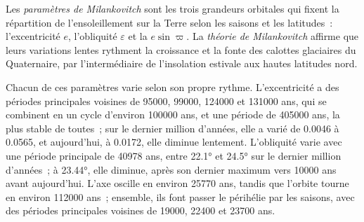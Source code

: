 \begin{definition}\label{def:b2:orbital-forcing:milankovitch}
Les \emph{paramètres de Milankovitch} sont les trois grandeurs orbitales
qui fixent la répartition de l'ensoleillement sur la Terre selon les saisons et les latitudes~: l'excentricité $e$,
l'obliquité $\varepsilon$ et la  $e\sin\varpi$. La \emph{théorie de
Milankovitch} affirme que leurs variations lentes rythment la croissance
et la fonte des calottes glaciaires du Quaternaire, par l'intermédiaire de l'insolation estivale aux
hautes latitudes nord.
\end{definition}

Chacun de ces paramètres varie selon son propre rythme. L'excentricité a des périodes principales voisines de \num{95000},
\num{99000}, \num{124000} et \num{131000} ans, qui se combinent en un cycle d'environ
\num{100000} ans, et une période de \num{405000} ans, la plus stable de toutes~; sur le dernier
million d'années, elle a varié de \num{0.0046} à \num{0.0565}, et aujourd'hui, à \num{0.0172}, elle diminue lentement.
L'obliquité varie avec une période principale de \num{40978} ans, entre \ang{22.1} et
\ang{24.5} sur le dernier million d'années~; à \ang{23.44}, elle diminue, après son dernier maximum
vers \num{10000} ans avant aujourd'hui. L'axe oscille en environ \num{25770} ans, tandis que
l'orbite tourne en environ \num{112000} ans~; ensemble, ils font passer le périhélie par les saisons, avec des
périodes principales voisines de \num{19000}, \num{22400} et \num{23700} ans.

